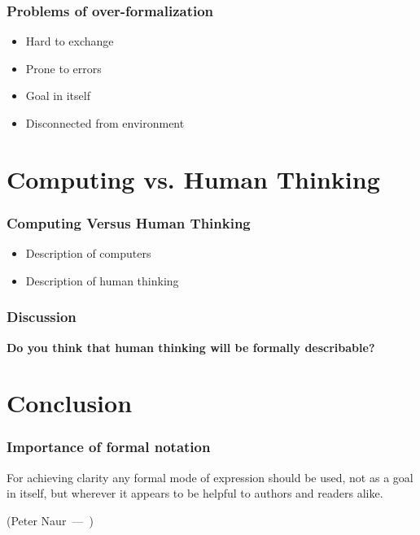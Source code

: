 \documentclass{beamer}
\let\oldquote\quote
\let\endoldquote\endquote
\renewenvironment{quote}[2][]
{\if\relax\detokenize{#1}\relax
	\def\quoteauthor{#2}%
	\else
	\def\quoteauthor{#2~---~#1}%
	\fi
	\oldquote}
{\par\nobreak\smallskip\hfill(\quoteauthor)%
	\endoldquote\addvspace{\bigskipamount}}
\begin{document}

\begin{frame} %
\frametitle{Problems of over-formalization}

\begin{itemize}
	\item Hard to exchange
	\item Prone to errors
	\item Goal in itself
	\item Disconnected from environment
\end{itemize}

\end{frame}

\section{Computing vs. Human Thinking}


\begin{frame} %
	\frametitle{Computing Versus Human Thinking}
	\begin{itemize}
		\item Description of computers
		\item Description of human thinking
	\end{itemize}
\end{frame}


\begin{frame}
	\frametitle{Discussion}
	\textbf{Do you think that human thinking will be formally describable?}
\end{frame}


\section{Conclusion}

\begin{frame}[fragile] %
	\frametitle{Importance of formal notation}
	\begin{quote}{Peter Naur}
			For achieving clarity any formal mode of expression should be used, not as a goal in itself, but wherever it appears to be helpful to authors and readers alike.
	\end{quote}
\end{frame}
\end{document}
